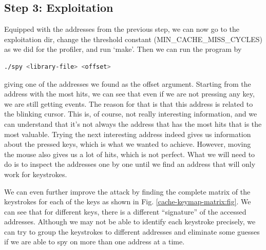 \subsection{Step 3: Exploitation}
Equipped with the addresses from the previous step, we can now go to the exploitation dir, change the threshold constant (MIN\_CACHE\_MISS\_CYCLES) as we did for the profiler, and run ‘make’. Then we can run the program by 
\begin{lstlisting}[language=bash]
./spy <library-file> <offset>
\end{lstlisting}
giving one of the addresses we found as the offset argument. Starting from the address with the most hits, we can see that even if we are not pressing any key, we are still getting events. The reason for that is that this address is related to the blinking cursor. This is, of course, not really interesting information, and we can understand that it’s not always the address that has the most hits that is the most valuable. Trying the next interesting address indeed gives us information about the pressed keys, which is what we wanted to achieve. However, moving the mouse also gives us a lot of hits, which is not perfect. What we will need to do is to inspect the addresses one by one until we find an address that will only work for keystrokes.

We can even further improve the attack by finding the complete matrix of the keystrokes for each of the keys as shown in Fig. \ref{cache-keymap-matrix:fig}. We can see that for different keys, there is a different “signature” of the accessed addresses. Although we may not be able to identify each keystroke precisely, we can try to group the keystrokes to different addresses and eliminate some guesses if we are able to spy on more than one address at a time.

